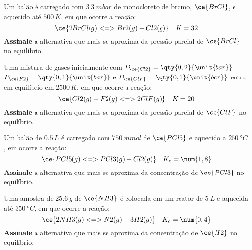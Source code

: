 \begin{problem}[
	id={2F25},
	path={/home/braun/Documents/Developer/braunchem/data/problems/Q2/2F/2F25}
]
Um balão é carregado com {\(\qty{3,3}{\unit{mbar}}\)} de monocloreto de bromo, {\(\ce{BrCl}\)}, e aquecido até {\(\qty{500}{\unit{K}}\)}, em que
ocorre a reação: {\[
    \ce{ 2 BrCl(g) <=> Br2(g) + Cl2(g) } \quad K = 32
\]} \textbf{Assinale} a alternativa que mais se aproxima da pressão parcial de {\(\ce{BrCl}\)} no equilíbrio.
\end{problem}


\begin{problem}[
	id={2F26},
	path={/home/braun/Documents/Developer/braunchem/data/problems/Q2/2F/2F26}
]
Uma mistura de gases inicialmente com {\(P_{\ce{Cl2}} = \qty{0,2}{\unit{bar}}\)}, {\(P_{\ce{F2}} = \qty{0,1}{\unit{bar}}\)} e
{\(P_{\ce{ClF}} = \qty{0,1}{\unit{bar}}\)} entra em equilíbrio em {\(\qty{2500}{\unit{K}}\)}, em que ocorre a reação: {\[
    \ce{ Cl2(g) + F2(g) <=> 2 ClF(g) } \quad K = 20
\]} \textbf{Assinale} a alternativa que mais se aproxima da pressão parcial de {\(\ce{ClF}\)} no equilíbrio.
\end{problem}


\begin{problem}[
	id={2F27},
	path={/home/braun/Documents/Developer/braunchem/data/problems/Q2/2F/2F27}
]
Um balão de {\(\qty{0,5}{\unit{L}}\)} é carregado com {\(\qty{750}{\unit{mmol}}\)} de {\(\ce{PCl5}\)} e aquecido a {\(\qty{250}{\unit{\degree C}}\)},
em ocorre a reação: {\[
    \ce{ PCl5(g) <=> PCl3(g) + Cl2(g) } \quad K_\mathrm{c} =
\num{1,8}
\]} \textbf{Assinale} a alternativa que mais se aproxima da concentração de {\(\ce{PCl3}\)} no equilíbrio.
\end{problem}


\begin{problem}[
	id={2F28},
	path={/home/braun/Documents/Developer/braunchem/data/problems/Q2/2F/2F28}
]
Uma amostra de {\(\qty{25,6}{\unit{g}}\)} de {\(\ce{NH3}\)} é colocada em um reator de {\(\qty{5}{\unit{L}}\)} e aquecida até
{\(\qty{350}{\unit{\degree C}}\)}, em que ocorre a reação: {\[
    \ce{ 2 NH3(g) <=> N2(g) + 3 H2(g) } \quad K_\mathrm{c} =
\num{0,4}
\]} \textbf{Assinale} a alternativa que mais se aproxima da concentração de {\(\ce{H2}\)} no equilíbrio.
\end{problem}


